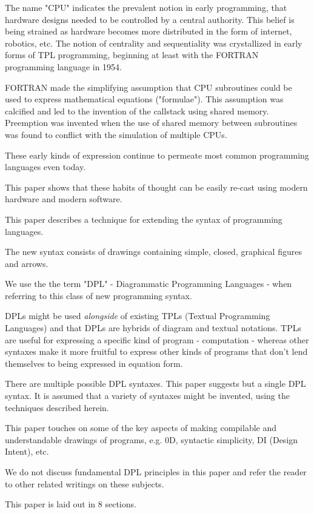 \documentclass[10pt,anonymous,review]{acmart}
\begin{document}
The name "CPU" indicates the prevalent notion in early programming, that
hardware designs needed to be controlled by a central authority. This
belief is being strained as hardware becomes more distributed in the
form of internet, robotics, etc. The notion of centrality and
sequentiality was crystallized in early forms of TPL programming,
beginning at least with the FORTRAN\cite{fortran} programming language in 1954.

FORTRAN made the simplifying assumption that CPU subroutines could be
used to express mathematical equations ("formulae"). This assumption was
calcified and led to the invention of the callstack using shared memory.
Preemption was invented when the use of shared memory between
subroutines was found to conflict with the simulation of multiple CPUs.

These early kinds of expression continue to permeate most common
programming languages even today.

This paper shows that these habits of thought can be easily
re-cast using modern hardware and modern software.

This paper describes a technique for extending the syntax of programming
languages.

The new syntax consists of drawings containing simple, closed, graphical
figures and arrows.

We use the the term "DPL" - Diagrammatic Programming Languages - when
referring to this class of new programming syntax.

DPLs might be used \emph{alongside} of existing TPLs (Textual
Programming Languages) and that DPLs are hybrids of diagram and textual
notations. TPLs are useful for expressing a specific kind of program -
computation - whereas other syntaxes make it more fruitful to express
other kinds of programs that don't lend themselves to being expressed in
equation form.

There are multiple possible DPL syntaxes. This paper suggests but a
single DPL syntax. It is assumed that a variety of syntaxes might be
invented, using the techniques described herein.

This paper touches on some of the key aspects of making compilable and
understandable drawings of programs, e.g. 0D, syntactic simplicity, DI
(Design Intent), etc.

We do not discuss fundamental DPL principles in this paper and refer the
reader to other related writings on these subjects.

This paper is laid out in 8 sections.
\end{document}
